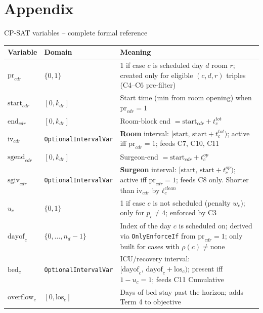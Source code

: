 \documentclass[10pt,aspectratio=169]{beamer}
\newcommand{\bk}{\hfill\hyperlink{toc}{\beamerreturnbutton{Agenda}}}
\begin{document}
\appendix
\section{Appendix}

\begin{frame}{CP-SAT variables -- complete formal reference}
  \tiny
  \begin{center}
  \begin{tabular}{p{3.0cm}p{2.9cm}p{6.4cm}}
    \toprule
    \textbf{Variable} & \textbf{Domain} & \textbf{Meaning} \\
    \midrule
    $\text{pr}_{cdr}$
      & $\{0,1\}$
      & 1 if case $c$ is scheduled day $d$ room $r$; created only for
        eligible $(c,d,r)$ triples (C4--C6 pre-filter) \\[2pt]
    $\text{start}_{cdr}$
      & $[0,k_{dr}]$
      & Start time (min from room opening) when $\text{pr}_{cdr}=1$ \\[2pt]
    $\text{end}_{cdr}$
      & $[0,k_{dr}]$
      & Room-block end $=\text{start}_{cdr}+t_c^{tot}$ \\[2pt]
    $\text{iv}_{cdr}$
      & \texttt{OptionalIntervalVar}
      & \textbf{Room} interval: $[\text{start},\,\text{start}+t_c^{tot})$;
        active iff $\text{pr}_{cdr}=1$; feeds C7, C10, C11 \\[2pt]
    $\text{sgend}_{cdr}$
      & $[0,k_{dr}]$
      & Surgeon-end $=\text{start}_{cdr}+t_c^{op}$ \\[2pt]
    $\text{sgiv}_{cdr}$
      & \texttt{OptionalIntervalVar}
      & \textbf{Surgeon} interval: $[\text{start},\,\text{start}+t_c^{op})$;
        active iff $\text{pr}_{cdr}=1$; feeds C8 only.
        Shorter than $\text{iv}_{cdr}$ by $t_c^{clean}$ \\[2pt]
    $u_c$
      & $\{0,1\}$
      & 1 if case $c$ is not scheduled (penalty $w_c$);
        only for $p_c\ne4$; enforced by C3 \\[2pt]
    $\text{dayof}_c$
      & $\{0,\dots,n_d-1\}$
      & Index of the day $c$ is scheduled on; derived via
        \texttt{OnlyEnforceIf} from $\text{pr}_{cdr}=1$;
        only built for cases with $\rho(c)\ne\text{none}$ \\[2pt]
    $\text{bed}_c$
      & \texttt{OptionalIntervalVar}
      & ICU/recovery interval: $[\text{dayof}_c,\,\text{dayof}_c+\text{los}_c)$;
        present iff $1-u_c=1$; feeds C11 Cumulative \\[2pt]
    $\text{overflow}_c$
      & $[0,\text{los}_c]$
      & Days of bed stay past the horizon;
        adds Term 4 to objective \\
    \bottomrule
  \end{tabular}
  \end{center}
  \bk
\end{frame}
\end{document}
